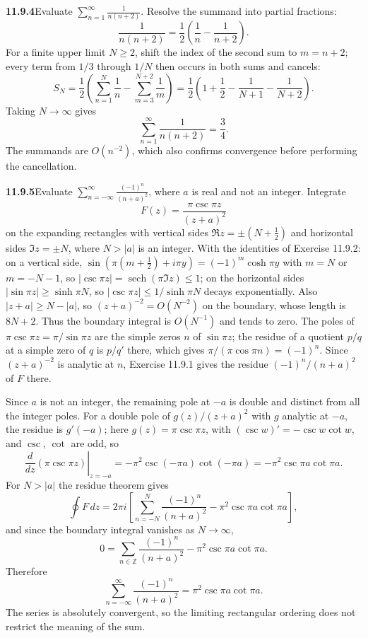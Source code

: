 \par\bigskip
\noindent\textbf{11.9.4}\quad Evaluate
$\displaystyle\sum_{n=1}^{\infty}\frac{1}{n(n+2)}$.
\solution
Resolve the summand into partial fractions:
\[
\frac1{n(n+2)}=\frac12\left(\frac1n-\frac1{n+2}\right).
\]
For a finite upper limit $N\ge2$, shift the index of the second sum
to $m=n+2$; every term from $1/3$ through $1/N$ then occurs in both
sums and cancels:
\[
S_N=\frac12\left(\sum_{n=1}^{N}\frac1n-\sum_{m=3}^{N+2}\frac1m\right)
=\frac12\left(1+\frac12-\frac1{N+1}-\frac1{N+2}\right).
\]
Taking $N\to\infty$ gives
\[
\boxed{\sum_{n=1}^{\infty}\frac1{n(n+2)}=\frac34}.
\]
The summands are $O(n^{-2})$, which also confirms convergence before
performing the cancellation.

\par\bigskip
\noindent\textbf{11.9.5}\quad Evaluate
$\displaystyle\sum_{n=-\infty}^{\infty}\frac{(-1)^{n}}{(n+a)^{2}}$, where $a$
is real and not an integer.
\solution
Integrate
\[
F(z)=\frac{\pi\csc\pi z}{(z+a)^2}
\]
on the expanding rectangles with vertical sides
$\Re z=\pm(N+\tfrac12)$ and horizontal sides $\Im z=\pm N$, where
$N>|a|$ is an integer. With the identities of Exercise 11.9.2:
on a vertical side,
$\sin(\pi(m+\tfrac12)+i\pi y)=(-1)^m\cosh\pi y$ with $m=N$ or
$m=-N-1$, so
$|\csc\pi z|=\operatorname{sech}(\pi\Im z)\le1$; on the horizontal
sides $|\sin\pi z|\ge\sinh\pi N$, so $|\csc\pi z|\le1/\sinh\pi N$
decays exponentially. Also $|z+a|\ge N-|a|$, so
$(z+a)^{-2}=O(N^{-2})$ on the boundary, whose length is $8N+2$.
Thus the boundary integral is $O(N^{-1})$ and tends to zero.
The poles of $\pi\csc\pi z=\pi/\sin\pi z$ are the simple zeros $n$
of $\sin\pi z$; the residue of a quotient $p/q$ at a simple zero of
$q$ is $p/q'$ there, which gives $\pi/(\pi\cos\pi n)=(-1)^n$.
Since $(z+a)^{-2}$ is analytic at $n$, Exercise 11.9.1 gives the
residue $(-1)^n/(n+a)^2$ of $F$ there.

Since $a$ is not an integer, the remaining pole at $-a$ is double
and distinct from all the integer poles. For a double pole of
$g(z)/(z+a)^2$ with $g$ analytic at $-a$, the residue is $g'(-a)$;
here $g(z)=\pi\csc\pi z$, with $(\csc w)'=-\csc w\cot w$, and
$\csc$, $\cot$ are odd, so
\[
\left.\frac{d}{dz}(\pi\csc\pi z)\right|_{z=-a}
=-\pi^2\csc(-\pi a)\cot(-\pi a)
=-\pi^2\csc\pi a\cot\pi a.
\]
For $N>|a|$ the residue theorem gives
\[
\oint F\,dz=2\pi i\left[\sum_{n=-N}^{N}\frac{(-1)^n}{(n+a)^2}
-\pi^2\csc\pi a\cot\pi a\right],
\]
and since the boundary integral vanishes as $N\to\infty$,
\[
0=\sum_{n\in\mathbb Z}\frac{(-1)^n}{(n+a)^2}
-\pi^2\csc\pi a\cot\pi a.
\]
Therefore
\[
\boxed{\sum_{n=-\infty}^{\infty}\frac{(-1)^n}{(n+a)^2}
=\pi^2\csc\pi a\cot\pi a}.
\]
The series is absolutely convergent, so the limiting rectangular
ordering does not restrict the meaning of the sum.

